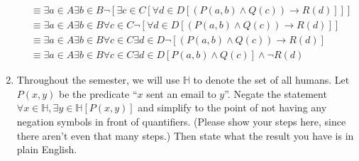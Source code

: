 \documentclass{article}
\begin{document}
\begin{enumerate}
\begin{equation}
\begin{align*}
                                                                                                                                          & \equiv \exists a \in A \exists b \in B \neg [\exists c \in C [\forall d \in D [ ( P(a,b) \wedge Q(c) ) \rightarrow R(d) ]]]     \\

                                                                                                                                          & \equiv \exists a \in A \exists b \in B \forall c \in C \neg [\forall d \in D [ ( P(a,b) \wedge Q(c) ) \rightarrow R(d) ]]       \\

                                                                                                                                          & \equiv \exists a \in A \exists b \in B \forall c \in C \exists d \in D \neg [ ( P(a,b) \wedge Q(c) ) \rightarrow R(d) ]         \\

                                                                                                                                          & \equiv \exists a \in A \exists b \in B \forall c \in C \exists d \in D [P(a,b) \wedge Q(c)] \wedge \neg R(d)
                  \end{align*}
            \end{equation}

            \newpage

      \item Throughout the semester, we will use $\mathbb{H}$ to denote the set of all
            humans. Let $P(x,y)$ be the predicate ``$x$ sent an email to $y$''. Negate the
            statement $\forall x \in \mathbb{H}, \exists y \in \mathbb{H} [P(x,y)]$ and
            simplify to the point of not having any negation symbols in front of
            quantifiers. (Please show your steps here, since there aren't even that many
            steps.) Then state what the result you have is in plain English.

            \newpage


\end{enumerate}
\end{document}
